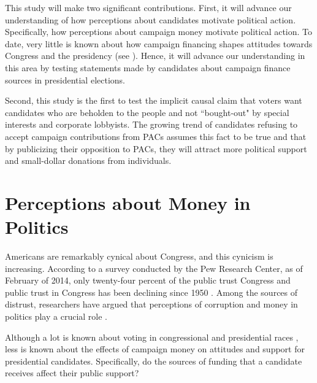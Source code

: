\documentclass[12pt]{article}
\begin{document}
This study will make two significant contributions. First, it will advance our understanding of how perceptions about candidates motivate political action. Specifically, how perceptions about campaign money motivate political action. To date, very little is known about how campaign financing shapes attitudes towards Congress and the presidency (see \cite{dowling_super_2014, bowler_campaign_2016}). Hence, it will advance our understanding in this area by testing statements made by candidates about campaign finance sources in presidential elections.

Second, this study is the first to test the implicit causal claim that voters want candidates who are beholden to the people and not ``bought-out" by special interests and corporate lobbyists. The growing trend of candidates refusing to accept campaign contributions from PACs assumes this fact to be true and that by publicizing their opposition to PACs, they will attract more political support and small-dollar donations from individuals.  


\section{Perceptions about Money in Politics}

 Americans are remarkably cynical about Congress, and this cynicism is increasing. According to a survey conducted by the Pew Research Center, as of February of 2014, only twenty-four percent of the public trust Congress \citep{pew_research_center_public_2014} and public trust in Congress has been declining since 1950 \citep{dalton_social_2005}. Among the sources of distrust, researchers have argued that perceptions of corruption and money in politics play a crucial role \citep{persily_perceptions_2004, vanheerde-hudson_parties_2013}. 
 
 Although a lot is known about voting in congressional \citep{abramowitz_explaining_1988, welch_effects_1997} and presidential races \citep{petrocik_issue_1996, nadeau_national_2001, polsby_landmarks_2002}, less is known about the effects of campaign money on attitudes and support for presidential candidates. Specifically, do the sources of funding that a candidate receives affect their public support? 
 
\end{document}
